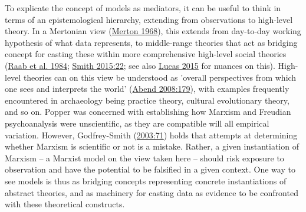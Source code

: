 \documentclass[
  a4paper,
  oneside]{uiophdthesis}
\begin{document}
To explicate the concept of models as mediators, it can be useful to think in terms of an epistemological hierarchy, extending from observations to high-level theory. In a Mertonian view (\protect\hyperlink{ref-merton1968}{Merton 1968}), this extends from day-to-day working hypothesis of what data represents, to middle-range theories that act as bridging concept for casting these within more comprehensive high-level social theories (\protect\hyperlink{ref-raab1984}{Raab et al. 1984}; \protect\hyperlink{ref-smith2015}{Smith 2015:22}; see also \protect\hyperlink{ref-lucas2015}{Lucas 2015} for nuances on this). High-level theories can on this view be understood as 'overall perspectives from which one sees and interprets the world' (\protect\hyperlink{ref-abend2008}{Abend 2008:179}), with examples frequently encountered in archaeology being practice theory, cultural evolutionary theory, and so on. Popper was concerned with establishing how Marxism and Freudian psychoanalysis were unscientific, as they are compatible will all empirical variation. However, Godfrey-Smith (\protect\hyperlink{ref-godfrey-smith2003}{2003:71}) holds that attempts at determining whether Marxism is scientific or not is a mistake. Rather, a given instantiation of Marxism -- a Marxist model on the view taken here -- should risk exposure to observation and have the potential to be falsified in a given context. One way to see models is thus as bridging concepts representing concrete instantiations of abstract theories, and as machinery for casting data as evidence to be confronted with these theoretical constructs.
\end{document}
